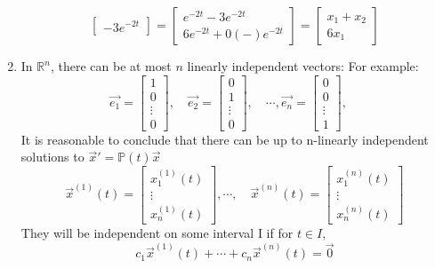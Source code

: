 \begin{enumerate}[label=\protect\circled{\arabic*}]
\begin{example-N}
\begin{equation*}
\begin{bmatrix}
				-3e^{-2t}
			\end{bmatrix} = 
			\begin{bmatrix}
				e^{-2t} - 3e^{-2t}\\
				6e^{-2t} + 0(-)e^{-2t}
			\end{bmatrix} = 
			\begin{bmatrix}
				x_1 + x_2 \\ 6x_1
			\end{bmatrix}
		\end{equation*}
	\end{example-N}
	\item In $\mathbb{R}^n$, there can be at most $n$ linearly independent vectors: For example:
	\begin{equation*}
		\vec{e_1} = \begin{bmatrix}
			1\\ 0\\ \vdots \\ 0
		\end{bmatrix}, \quad 
		\vec{e_2} = \begin{bmatrix}
			0\\ 1\\ \vdots \\ 0
		\end{bmatrix}, \quad \cdots,
		\vec{e_n} = \begin{bmatrix}
			0\\ 0\\ \vdots \\ 1
		\end{bmatrix}, \quad 
	\end{equation*}
	It is reasonable to conclude that there can be up to n-linearly independent solutions to $\vec{x}' = \mathbb{P}(t)\vec{x}$
	\begin{equation*}
		\vec{x}^{(1)}(t) = 
		\begin{bmatrix}
			x_1^{(1)}(t)\\ \vdots \\ x_n^{(1)}(t)
		\end{bmatrix}, \cdots, \quad \vec{x}^{(n)}(t) =  
		\begin{bmatrix}
			x_1^{(n)}(t)\\ \vdots \\ x_n^{(n)}(t)
		\end{bmatrix}
	\end{equation*}
	They will be independent on some interval I if for $t \in I$,
	\begin{equation*}
		c_1 \vec{x}^{(1)}(t) + \cdots + c_n\vec{x}^{(n)}(t) = \vec{0}

\end{equation*}
\end{enumerate}
